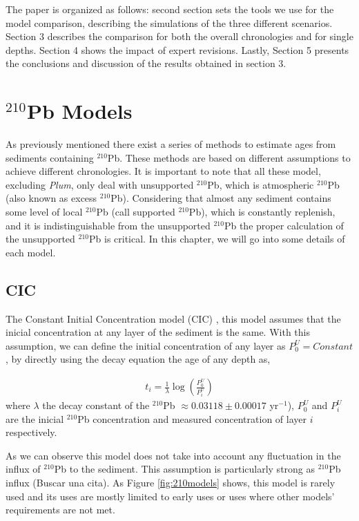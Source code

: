 \documentclass [10pt] {article}
\begin{document}
The paper is organized as follows: second section sets the tools we use for the model comparison, describing the simulations of the three different scenarios.
Section 3 describes the comparison for both the overall chronologies and for single depths.
Section 4 shows the impact of expert revisions.
Lastly, Section 5 presents the conclusions and discussion of the results obtained in section 3. 

\section{$^{210}$Pb Models}

As previously mentioned there exist a series of methods to estimate ages from sediments containing $^{210}$Pb.  
These methods are based on different assumptions to achieve different chronologies. 
It is important to note that all these model, excluding \textit{Plum}, only deal with unsupported $^{210}$Pb, which is atmospheric $^{210}$Pb (also known as excess $^{210}$Pb). 
Considering that almost any sediment contains some level of local $^{210}$Pb (call supported $^{210}$Pb), which is constantly replenish, and it is indistinguishable from the unsupported $^{210}$Pb the proper calculation of the unsupported $^{210}$Pb is critical.  
In this chapter, we will go into some details of each model.

\subsection{CIC}

The Constant Initial Concentration model (CIC) \citep{Goldberg1963,Crozaz1964,Robbins1978}, this model assumes that the inicial concentration at any layer of the sediment is the same. 
With this assumption, we can define the initial concentration of any layer as $P_0^U = Constant$, by directly using the decay equation the age of any depth as,

\begin{eqnarray}
	t_i = \frac{1}{\lambda}\log \left( \frac{P_0^U}{P_i^U}\right)
\end{eqnarray}
where $\lambda$ the decay constant of the $^{210}$Pb $\approx 0.03118\pm 0.00017$ yr$^{-1}$), $P_0^U$ and $P_i^U$ are the inicial $^{210}$Pb concentration and measured concentration of layer $i$ respectively. 

As we can observe this model does not take into account any fluctuation in the influx of $^{210}$Pb to the sediment. 
This assumption is particularly strong as $^{210}$Pb influx (Buscar una cita).
As Figure \ref{fig:210models} shows, this model is rarely used and its uses are mostly limited to early uses or uses where other models' requirements are not met.
\end{document}
